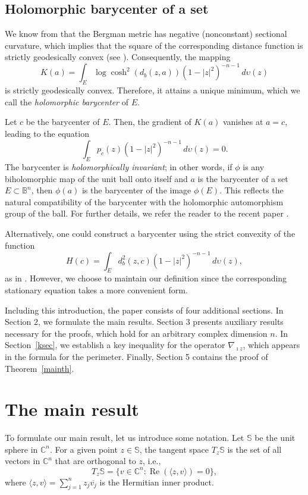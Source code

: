 \documentclass[11pt]{amsart}
\numberwithin{equation}{section}
\begin{document}
 \subsection{Holomorphic barycenter of a set}

We know from \cite[p.~54]{goldman} that the Bergman metric has negative (nonconstant) sectional curvature, which implies that the square of the corresponding distance function is strictly geodesically convex (see \cite[eq.~4.8.7]{jost}). Consequently, the mapping
\begin{equation}\label{baryb}
    K(a) = \int_{E} \log \cosh^2 (d_b(z,a)) (1 - |z|^2)^{-n-1} \, d\upsilon(z)
\end{equation}
is strictly geodesically convex. Therefore, it attains a unique minimum, which we call  the \emph{holomorphic barycenter} of $E$.

Let $c$ be the barycenter of $E$. Then, the gradient of $K(a)$ vanishes at $a = c$, leading to the equation
\begin{equation}\label{barizero}
    \int_{E} p_c(z) (1 - |z|^2)^{-n-1} \, d\upsilon(z) = 0.
\end{equation}
 The barycenter is \emph{holomorphically invariant}; in other words, if $\phi$ is any biholomorphic map of the unit ball onto itself and $a$ is the barycenter of a set $E \subset \mathbb{B}^n$, then $\phi(a)$ is the barycenter of the image $\phi(E)$. This reflects the natural compatibility of the barycenter with the holomorphic automorphism group of the ball. For further details, we refer the reader to the recent paper \cite{jk}.


Alternatively, one could construct a barycenter using the strict convexity of the function
\[
    H(c) = \int_{E} d^2_b(z,c) (1 - |z|^2)^{-n-1} \, d\upsilon(z),
\]
as in \cite{duzzar}. However, we choose to maintain our definition since the corresponding stationary equation takes a more convenient form.

Including this introduction, the paper consists of four additional sections. In Section 2, we formulate the main results. Section 3 presents auxiliary results necessary for the proofs, which hold for an arbitrary complex dimension \( n \). In Section~\ref{ksec}, we establish a key inequality for the operator \( \nabla_{\imath z} \), which appears in the formula for the perimeter. Finally, Section 5 contains the proof of Theorem~\ref{mainth}.

\section{The main result}
To formulate our main result, let us introduce some notation. Let $\mathbb{S}$ be the unit sphere in $\mathbb{C}^n$.
For a given point $z \in \mathbb{S}$, the tangent space $T_z \mathbb{S}$ is the set of all vectors in $\mathbb{C}^n$ that are orthogonal to $z$, i.e.,
\[
T_z \mathbb{S} = \{ v \in \mathbb{C}^n : \operatorname{Re}(\langle z, v \rangle) = 0 \},
\]
where $\langle z, v \rangle = \sum_{j=1}^n z_j \overline{v_j}$ is the Hermitian inner product.
\end{document}
